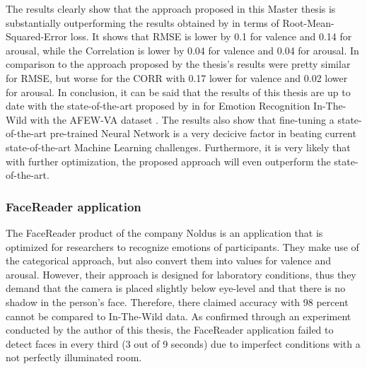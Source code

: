The results clearly show that the approach proposed in this Master thesis is substantially outperforming the results obtained by \citet{Kossaifi:2017:AFEW-VADatabase} in terms of Root-Mean-Squared-Error loss. It shows that RMSE is lower by 0.1 for valence and 0.14 for arousal, while the Correlation is lower by 0.04 for valence and 0.04 for arousal. In comparison to the approach proposed by \citet{Handrich:2020:SimultaneousPredVA} the thesis's results were pretty similar for RMSE, but worse for the CORR with 0.17 lower for valence and 0.02 lower for arousal.
\newline\newline
In conclusion, it can be said that the results of this thesis are up to date with the state-of-the-art proposed by \citet{Handrich:2020:SimultaneousPredVA} in \citeyear{Handrich:2020:SimultaneousPredVA} for Emotion Recognition In-The-Wild with the AFEW-VA dataset \citep{Kossaifi:2017:AFEW-VADatabase}. The results also show that fine-tuning a state-of-the-art pre-trained Neural Network is a very decicive factor in beating current state-of-the-art Machine Learning challenges. Furthermore, it is very likely that with further optimization, the proposed approach will even outperform the state-of-the-art.

\subsubsection{FaceReader application}
The FaceReader product of the company Noldus\citep{Noldus:2020:Facereader} is an application that is optimized for researchers to recognize emotions of participants. They make use of the categorical approach, but also convert them into values for valence and arousal. However, their approach is designed for laboratory conditions, thus they demand that the camera is placed slightly below eye-level and that there is no shadow in the person's face. Therefore, there claimed accuracy with 98 percent cannot be compared to In-The-Wild data. As confirmed through an experiment conducted by the author of this thesis, the FaceReader application failed to detect faces in every third (3 out of 9 seconds) due to imperfect conditions with a not perfectly illuminated room.


